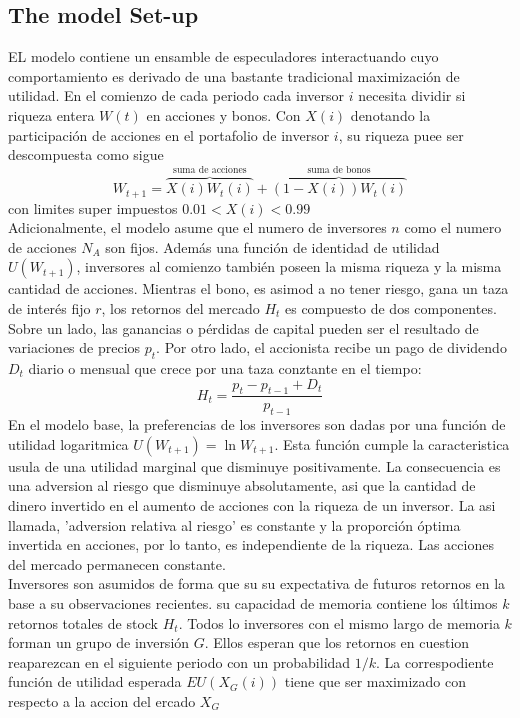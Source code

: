 \documentclass[12pt,a4paper]{article}
\begin{document}
\subsection*{The model Set-up}
EL modelo contiene un ensamble de especuladores interactuando cuyo comportamiento es derivado de una bastante tradicional maximización de utilidad. En el comienzo de cada periodo cada inversor $i$ necesita dividir si riqueza entera $W(t)$ en acciones y bonos. Con $X(i)$ denotando la participación de acciones en el portafolio de inversor $i$, su riqueza puee ser descompuesta como sigue
\begin{equation}
W_{t+1} = \overbrace{X(i)W_{t}(i)}^{\textrm{suma de acciones}} + \overbrace{(1-X(i))W_t(i)}^{\textrm{suma de bonos}}
\end{equation}
con limites super impuestos $0.01<X(i)<0.99$\\
\quad Adicionalmente, el modelo asume que el numero de inversores $n$ como el numero de acciones $N_A$ son fijos. Además una función de identidad de utilidad $U(W_{t+1})$, inversores al comienzo también poseen la misma riqueza y la misma cantidad de acciones. Mientras el bono, es asimod a no tener riesgo, gana un taza de interés fijo $r$, los retornos del mercado $H_t$ es compuesto de dos componentes. Sobre un lado, las ganancias o pérdidas de capital pueden ser el resultado de variaciones de precios $p_t$. Por otro lado, el accionista recibe un pago de dividendo $D_t$ diario o mensual que crece por una taza conztante en el tiempo:
\begin{equation}
H_t = \frac{p_t-p_{t-1}+D_t}{p_{t-1}}
\end{equation} 
\quad En el modelo base, la preferencias de los inversores son dadas por una función de utilidad logaritmica $U(W_{t+1})=\ln{W_{t+1}}$. Esta función cumple la caracteristica usula de una utilidad marginal que disminuye positivamente. La consecuencia es una adversion al riesgo que disminuye absolutamente, asi que la cantidad de dinero invertido en el aumento de acciones con la riqueza de un inversor. La asi llamada, 'adversion relativa al riesgo' es constante y la proporción óptima invertida en acciones, por lo tanto, es independiente de la riqueza. Las acciones del mercado permanecen constante.\\
\quad Inversores son asumidos de forma que su su expectativa de futuros retornos en la base a su observaciones recientes. su capacidad de memoria contiene los últimos $k$ retornos totales de stock $H_t$. Todos lo inversores con el mismo largo de memoria $k$ forman un grupo de inversión $G$. Ellos esperan que los retornos en cuestion reaparezcan en el siguiente periodo con un probabilidad $1/k$. La correspodiente función de utilidad esperada $EU(X_{G}(i))$ tiene que ser maximizado con respecto a la accion del ercado $X_G$
\end{document}
